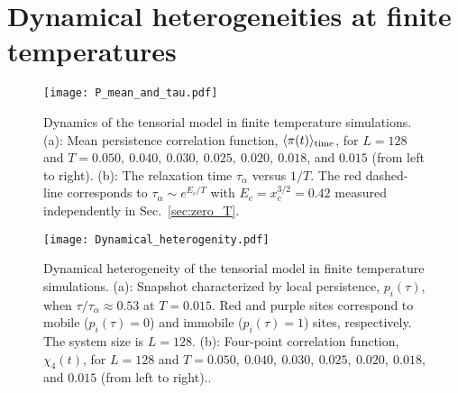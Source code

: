 \documentclass[pre,twocolumn,superscriptaddress,tightenlines,showpacs,longbibliography,floatfix,footinbib]{revtex4-1}
\begin{document}



\section{Dynamical heterogeneities at finite temperatures}
\label{sec:finite_T}



\begin{figure}
\centering
\texttt{[image: P\_mean\_and\_tau.pdf]}
\caption{Dynamics of the tensorial model in finite temperature simulations.
(a): Mean persistence correlation function, $\langle \pi(t) \rangle_{\rm time}$, for $L=128$ and $T=0.050, ~ 0.040, ~ 0.030, ~ 0.025, ~ 0.020, ~ 0.018$, and $0.015$ (from left to right). (b): The relaxation time $\tau_\alpha$ versus $1/T$. The red dashed-line corresponds to $\tau_\alpha \sim e^{E_c/T}$ with $E_c=x_c^{3/2}=0.42$ measured independently in Sec.~\ref{sec:zero_T}.
}
\label{fig:P_mean_and_tau}
\end{figure}


\begin{figure}
\centering
\texttt{[image: Dynamical\_heterogenity.pdf]}
\caption{Dynamical heterogeneity of the tensorial model in finite temperature simulations.
(a): Snapshot
characterized by local persistence, $p_i(\tau)$, when $\tau/\tau_\alpha \approx 0.53$ at $T=0.015$.
Red and purple sites correspond to mobile ($p_i(\tau)=0$) and immobile ($p_i(\tau)=1$) sites, respectively. The system size is $L=128$. (b): Four-point correlation function, $\chi_4(t)$, for $L=128$ and $T=0.050, ~ 0.040, ~ 0.030, ~ 0.025, ~ 0.020, ~ 0.018$, and $0.015$ (from left to right)..
}
\label{fig:Dynamical_heterogenity}
\end{figure}
\end{document}
